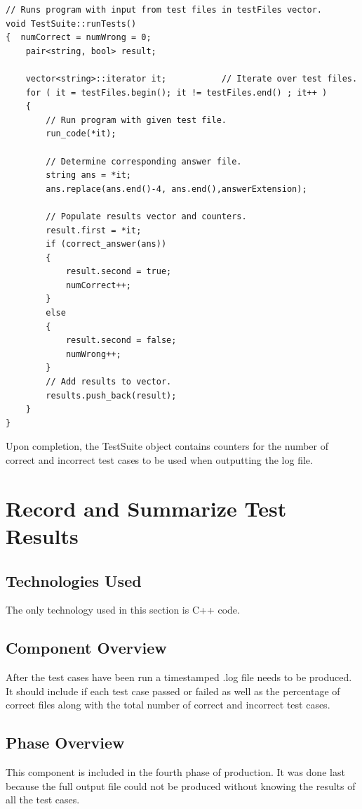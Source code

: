 \begin{lstlisting}
// Runs program with input from test files in testFiles vector.
void TestSuite::runTests()
{  numCorrect = numWrong = 0;
    pair<string, bool> result;

    vector<string>::iterator it;           // Iterate over test files.
    for ( it = testFiles.begin(); it != testFiles.end() ; it++ )
    {
        // Run program with given test file.
        run_code(*it);

        // Determine corresponding answer file.
        string ans = *it;
        ans.replace(ans.end()-4, ans.end(),answerExtension);

        // Populate results vector and counters.
        result.first = *it;
        if (correct_answer(ans))
        {
            result.second = true;
            numCorrect++;
        }
        else
        {
            result.second = false;
            numWrong++;
        }
        // Add results to vector.
        results.push_back(result);
    }
}
\end{lstlisting}
Upon completion, the TestSuite object contains counters for the number of correct and incorrect test cases to be used when outputting the log file.

\section{Record and Summarize Test Results }

\subsection{Technologies  Used}
The only technology used in this section is C++ code.

\subsection{Component  Overview}
After the test cases have been run a timestamped .log file needs to be produced. It should include if each test case passed or failed as well as the percentage of correct files along with the total number of correct and incorrect test cases.

\subsection{Phase Overview}
This component is included in the fourth phase of production. It was done last because the full output file could not be produced without knowing the results of all the test cases.

